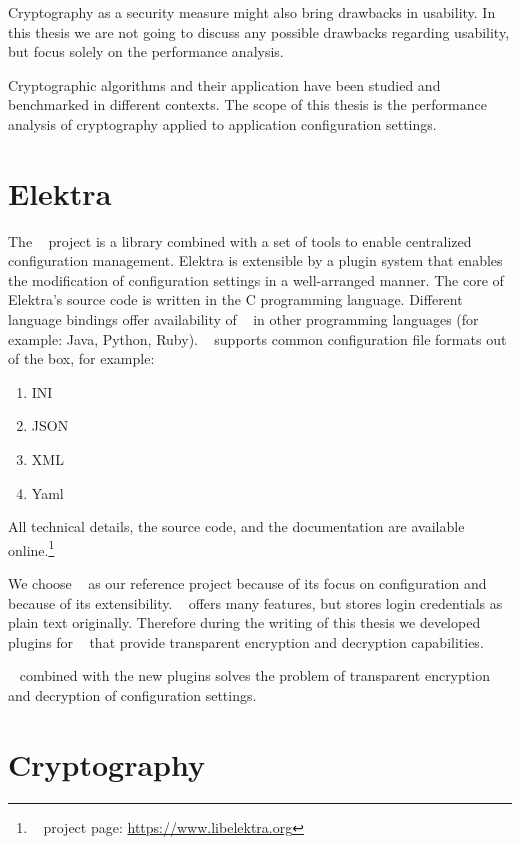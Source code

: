 
Cryptography as a security measure might also bring drawbacks in usability.
In this thesis we are not going to discuss any possible drawbacks regarding usability, but focus solely on the performance analysis.

Cryptographic algorithms and their application have been studied and benchmarked in different contexts.\cite{ocf,freebsdtls,thakur2011aes}
The scope of this thesis is the performance analysis of cryptography applied to application configuration settings.

\section{Elektra}

The \elektra~ project is a library combined with a set of tools to enable centralized configuration management.
Elektra is extensible by a plugin system that enables the modification of configuration settings in a well-arranged manner.
The core of Elektra's source code is written in the C programming language.
Different language bindings offer availability of \elektra~ in other programming languages (for example: Java, Python, Ruby).
\elektra~ supports common configuration file formats out of the box, for example:\cite{elektra-doc,raab2010thesis}
\begin{enumerate}
\item INI
\item JSON
\item XML
\item Yaml
\end{enumerate}

All technical details, the source code, and the documentation are available online.\footnote{\elektra~ project page: \url{https://www.libelektra.org}}

We choose \elektra~ as our reference project because of its focus on configuration and because of its extensibility.
\elektra~ offers many features, but stores login credentials as plain text originally.
Therefore during the writing of this thesis we developed plugins for \elektra~ that provide transparent encryption and decryption capabilities.

\elektra~ combined with the new plugins solves the problem of transparent encryption and decryption of configuration settings.

\section{Cryptography}

